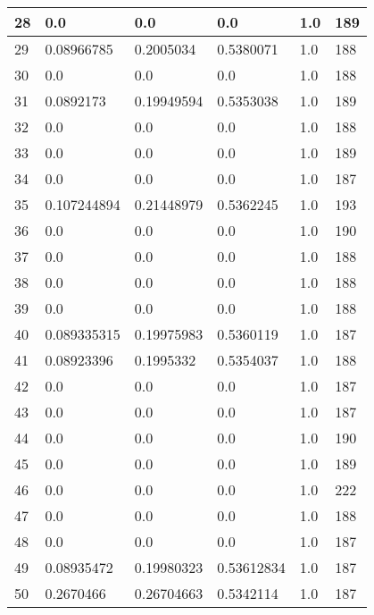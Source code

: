 \begin{longtable}{|l|l|l|l|l|l|}
28 & 0.0 & 0.0 & 0.0 & 1.0 & 189 \\ \hline 
29 & 0.08966785 & 0.2005034 & 0.5380071 & 1.0 & 188 \\ \hline 
30 & 0.0 & 0.0 & 0.0 & 1.0 & 188 \\ \hline 
31 & 0.0892173 & 0.19949594 & 0.5353038 & 1.0 & 189 \\ \hline 
32 & 0.0 & 0.0 & 0.0 & 1.0 & 188 \\ \hline 
33 & 0.0 & 0.0 & 0.0 & 1.0 & 189 \\ \hline 
34 & 0.0 & 0.0 & 0.0 & 1.0 & 187 \\ \hline 
35 & 0.107244894 & 0.21448979 & 0.5362245 & 1.0 & 193 \\ \hline 
36 & 0.0 & 0.0 & 0.0 & 1.0 & 190 \\ \hline 
37 & 0.0 & 0.0 & 0.0 & 1.0 & 188 \\ \hline 
38 & 0.0 & 0.0 & 0.0 & 1.0 & 188 \\ \hline 
39 & 0.0 & 0.0 & 0.0 & 1.0 & 188 \\ \hline 
40 & 0.089335315 & 0.19975983 & 0.5360119 & 1.0 & 187 \\ \hline 
41 & 0.08923396 & 0.1995332 & 0.5354037 & 1.0 & 188 \\ \hline 
42 & 0.0 & 0.0 & 0.0 & 1.0 & 187 \\ \hline 
43 & 0.0 & 0.0 & 0.0 & 1.0 & 187 \\ \hline 
44 & 0.0 & 0.0 & 0.0 & 1.0 & 190 \\ \hline 
45 & 0.0 & 0.0 & 0.0 & 1.0 & 189 \\ \hline 
46 & 0.0 & 0.0 & 0.0 & 1.0 & 222 \\ \hline 
47 & 0.0 & 0.0 & 0.0 & 1.0 & 188 \\ \hline 
48 & 0.0 & 0.0 & 0.0 & 1.0 & 187 \\ \hline 
49 & 0.08935472 & 0.19980323 & 0.53612834 & 1.0 & 187 \\ \hline 
50 & 0.2670466 & 0.26704663 & 0.5342114 & 1.0 & 187 \\ \hline 
\end{longtable}